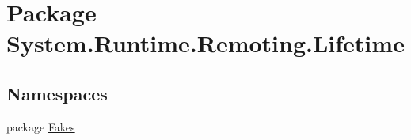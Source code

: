 \hypertarget{namespace_system_1_1_runtime_1_1_remoting_1_1_lifetime}{\section{Package System.\-Runtime.\-Remoting.\-Lifetime}
\label{namespace_system_1_1_runtime_1_1_remoting_1_1_lifetime}
}
\subsection*{Namespaces}
\begin{DoxyCompactItemize}
\item 
package \hyperlink{namespace_system_1_1_runtime_1_1_remoting_1_1_lifetime_1_1_fakes}{Fakes}
\end{DoxyCompactItemize}
